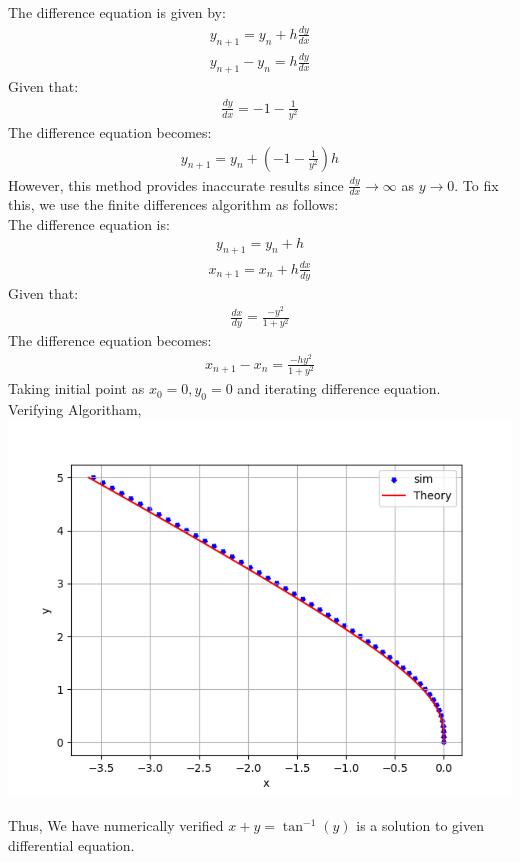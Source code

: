 \documentclass[journal]{IEEEtran}
\numberwithin{equation}{enumi}
\numberwithin{figure}{enumi}
\begin{document}
The difference equation is given by:
\begin{align}
y_{n+1} = y_{n} + h \frac{dy}{dx}
\end{align}
\begin{align}
y_{n+1} - y_{n} = h \frac{dy}{dx}
\end{align}
Given that:
\begin{align}
\frac{dy}{dx} = -1 - \frac{1}{y^2}
\end{align}
The difference equation becomes:
\begin{align}
y_{n+1} = y_{n} + (-1 - \frac{1}{y^2})h
\end{align}
However, this method provides inaccurate results since $ \frac{dy}{dx} \to \infty $ as $ y \to 0 $. To fix this, we use the finite differences algorithm as follows:\\
The difference equation is:
\begin{align}
y_{n+1} = y_{n} + h
\end{align}
\begin{align}
x_{n+1} = x_{n} + h \frac{dx}{dy}
\end{align}
Given that:
\begin{align}
\frac{dx}{dy} = \frac{-y^2}{1 + y^2}
\end{align}
The difference equation becomes:
\begin{align}
x_{n+1} - x_{n} = \frac{-h y^2}{1 + y^2}
\end{align}
Taking  initial point as $x_{0}=0, y_{0}=0$ and iterating difference equation.\\
Verifying Algoritham,\\
    \includegraphics[width=\columnwidth]{Figs/Figure_1.png} 

Thus, We have numerically verified $x+y=\tan^{-1}(y) $ is a solution to given differential equation.
\end{document}
